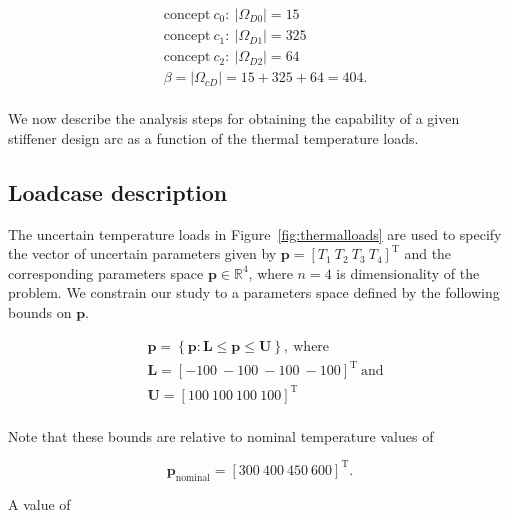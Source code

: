 \begin{equation*}
	\begin{aligned}
		& \mathrm{concept~}c_0:~|\Omega_{D0}| = 15\\
		& \mathrm{concept~}c_1:~|\Omega_{D1}| = 325\\
		& \mathrm{concept~}c_2:~|\Omega_{D2}| = 64\\
		& \beta = |\Omega_{cD}| = 15 + 325 + 64 = 404.\\
	\end{aligned}
\end{equation*}

We now describe the analysis steps for obtaining the capability of a given stiffener design arc as a function of the thermal temperature loads.

\subsection{Loadcase description} \label{subsec:loadcase}

The uncertain temperature loads in Figure~\ref{fig:thermalloads} are used to specify the vector of uncertain parameters given by $\mathbf{p} = \left[T_1 ~ T_2 ~ T_3 ~ T_4\right]^{\mathrm{T}}$ and the corresponding parameters space $\mathbf{p}\in\mathbb{R}^4$, where $n = 4$ is dimensionality of the problem. We constrain our study to a parameters space defined by the following bounds on $\mathbf{p}$.

\begin{equation*}
	\begin{aligned}
		& \mathbf{p} = \left\{\mathbf{p}: \mathbf{L} \le \mathbf{p} \le \mathbf{U}\right\},~\textrm{where}\\
		& \mathbf{L} = \left[-100 ~ -100 ~ -100 ~ -100\right]^{\mathrm{T}}~\textrm{and}\\
		& \mathbf{U} = \left[100 ~ 100 ~ 100 ~ 100\right]^{\mathrm{T}}\\
	\end{aligned}
\end{equation*}

Note that these bounds are relative to nominal temperature values of 

\begin{equation*}
	\mathbf{p}_{\textrm{nominal}} = \left[300 ~ 400 ~ 450 ~ 600\right]^{\mathrm{T}}.
\end{equation*}

A value of 

